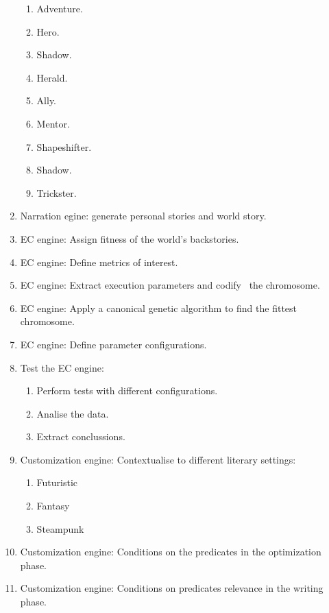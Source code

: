 \documentclass[a4paper]{article}
\begin{document}
\begin{enumerate}
\begin{enumerate}
\item Adventure. 
\item Hero. 
\item Shadow. 
\item Herald. 
\item Ally. 
\item Mentor. 
\item Shapeshifter. 
\item Shadow. 
\item Trickster. 
\end{enumerate}
\item Narration egine: generate personal stories and world story. 
\item EC engine: Assign fitness of the world{\textquoteright}s
backstories. 
\item EC engine: Define metrics of interest. 
\item EC engine: Extract execution parameters and codify~ the
chromosome. 
\item EC engine: Apply a canonical genetic algorithm to find the fittest
chromosome. 
\item EC engine: Define parameter configurations. 
\item Test the EC engine: 

\begin{enumerate}
\item Perform tests with different configurations. 
\item Analise the data. 
\item Extract conclussions. 
\end{enumerate}
\item Customization engine: Contextualise to different literary
settings: 

\begin{enumerate}
\item Futuristic 
\item Fantasy 
\item Steampunk 
\end{enumerate}
\item Customization engine: Conditions on the predicates in the
optimization phase. 
\item Customization engine: Conditions on predicates relevance in the
writing phase. 
\end{enumerate}
\end{document}
